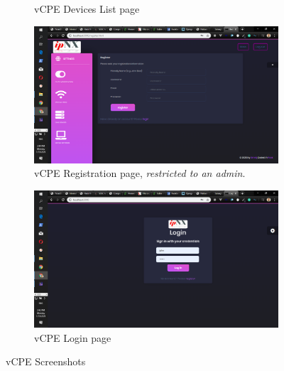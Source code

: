 \begin{figure}[!htbp]
\begin{subfigure}[b]{0.45\textwidth}
	\caption{\ac{vCPE}  Devices List page}
\end{subfigure}
\medskip
\begin{subfigure}[b]{0.45\textwidth}
	\centering
	\includegraphics[width=\linewidth]{./vcperegister}
	\caption{\ac{vCPE} Registration page, \textit{restricted to an admin}.}
\end{subfigure}\hfill
\begin{subfigure}[b]{0.45\textwidth}
	\centering
	\includegraphics[width=\linewidth]{./vcpelogin}
	\caption{\ac{vCPE} Login page}
\end{subfigure}
	\caption{\ac{vCPE} Screenshots}
\end{figure}
